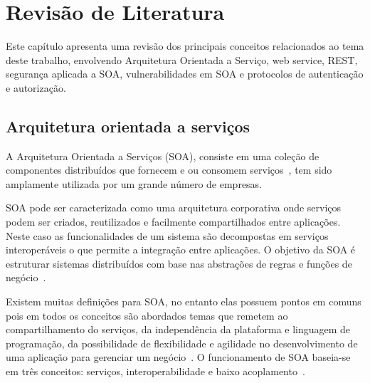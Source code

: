 \chapter{Revisão de Literatura}\label{cap:revisaolit}
Este capítulo apresenta uma revisão dos principais conceitos relacionados ao tema deste trabalho, envolvendo Arquitetura Orientada a Serviço, web service, REST, segurança aplicada a SOA, vulnerabilidades em SOA e protocolos de autenticação e autorização.

\section{Arquitetura orientada a serviços}


A Arquitetura Orientada a Serviços (SOA), consiste em uma coleção de componentes distribuídos que fornecem e ou consomem serviços~\cite{Clements2010}, tem sido amplamente utilizada por um grande número de empresas.


SOA pode ser caracterizada como uma arquitetura corporativa onde serviços podem ser criados, reutilizados e facilmente compartilhados entre aplicações. Neste caso as funcionalidades de um sistema são decompostas em serviços interoperáveis o que permite a integração entre aplicações. O objetivo da SOA é estruturar sistemas distribuídos com base nas abstrações de regras e funções de negócio~\cite{Josuttis07}.

Existem muitas definições para SOA, no entanto elas possuem pontos em comuns pois em todos os conceitos são abordados temas que remetem ao compartilhamento do serviços, da independência da plataforma e linguagem de programação, da possibilidade de flexibilidade e agilidade no desenvolvimento de uma aplicação para gerenciar um negócio~\cite{ERL09}. O funcionamento de SOA baseia-se em três conceitos: serviços, interoperabilidade e baixo acoplamento~\cite{Josuttis07}.

